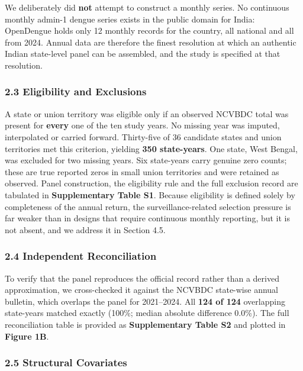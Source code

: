 \documentclass[
  10pt,
  twocolumn]{article}
\begin{document}
We deliberately did \textbf{not} attempt to construct a monthly series.
No continuous monthly admin-1 dengue series exists in the public domain
for India: OpenDengue holds only 12 monthly records for the country, all
national and all from 2024. Annual data are therefore the finest
resolution at which an authentic Indian state-level panel can be
assembled, and the study is specified at that resolution.

\subsubsection{2.3 Eligibility and
Exclusions}\label{eligibility-and-exclusions}

A state or union territory was eligible only if an observed NCVBDC total
was present for \textbf{every} one of the ten study years. No missing
year was imputed, interpolated or carried forward. Thirty-five of 36
candidate states and union territories met this criterion, yielding
\textbf{350 state-years}. One state, West Bengal, was excluded for two
missing years. Six state-years carry genuine zero counts; these are true
reported zeros in small union territories and were retained as observed.
Panel construction, the eligibility rule and the full exclusion record
are tabulated in \textbf{Supplementary Table S1}. Because eligibility is
defined solely by completeness of the annual return, the
surveillance-related selection pressure is far weaker than in designs
that require continuous monthly reporting, but it is not absent, and we
address it in Section 4.5.

\subsubsection{2.4 Independent
Reconciliation}\label{independent-reconciliation}

To verify that the panel reproduces the official record rather than a
derived approximation, we cross-checked it against the NCVBDC state-wise
annual bulletin, which overlaps the panel for 2021--2024. All
\textbf{124 of 124} overlapping state-years matched exactly (100\%;
median absolute difference 0.0\%). The full reconciliation table is
provided as \textbf{Supplementary Table S2} and plotted in
\textbf{Figure 1B}.

\subsubsection{2.5 Structural Covariates}\label{structural-covariates}
\end{document}
